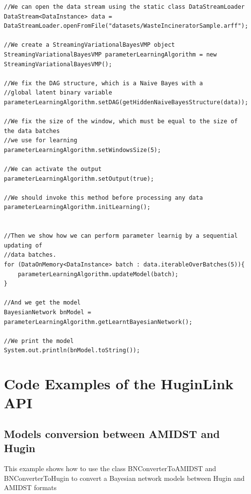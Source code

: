 \begin{lstlisting}
//We can open the data stream using the static class DataStreamLoader
DataStream<DataInstance> data = DataStreamLoader.openFromFile("datasets/WasteIncineratorSample.arff");

//We create a StreamingVariationalBayesVMP object
StreamingVariationalBayesVMP parameterLearningAlgorithm = new StreamingVariationalBayesVMP();

//We fix the DAG structure, which is a Naive Bayes with a 
//global latent binary variable
parameterLearningAlgorithm.setDAG(getHiddenNaiveBayesStructure(data));

//We fix the size of the window, which must be equal to the size of the data batches 
//we use for learning
parameterLearningAlgorithm.setWindowsSize(5);

//We can activate the output
parameterLearningAlgorithm.setOutput(true);

//We should invoke this method before processing any data
parameterLearningAlgorithm.initLearning();


//Then we show how we can perform parameter learnig by a sequential updating of 
//data batches.
for (DataOnMemory<DataInstance> batch : data.iterableOverBatches(5)){
    parameterLearningAlgorithm.updateModel(batch);
}

//And we get the model
BayesianNetwork bnModel = parameterLearningAlgorithm.getLearntBayesianNetwork();

//We print the model
System.out.println(bnModel.toString());
\end{lstlisting}


\chapter{Code Examples of the HuginLink API}\label{sec:codeExamples}

\section{Models conversion between AMIDST and Hugin}

This example shows how to use the class BNConverterToAMIDST and BNConverterToHugin to convert a 
Bayesian network models between Hugin and AMIDST formats



